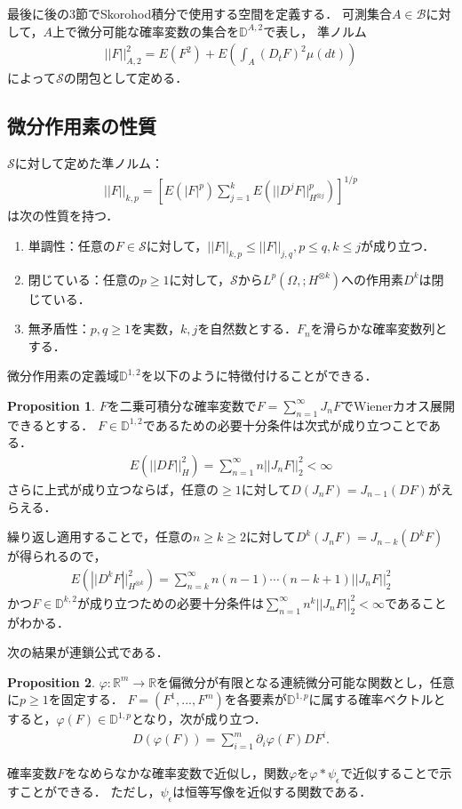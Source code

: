 \documentclass[a4paper,10pt]{jsarticle}
\theoremstyle{definition}
\newtheorem{proposition}{Proposition}
\newcommand{\eq}[1]{\begin{align}#1\end{align}}
\newcommand{\enums}[1]{\begin{enumerate}#1\end{enumerate}}
\begin{document}
最後に後の3節でSkorohod積分で使用する空間を定義する．
可測集合$A\in\mathcal{B}$に対して，$A$上で微分可能な確率変数の集合を$\mathbb{D}^{A,2}$で表し，
準ノルム
\eq{||F||^2_{A,2}=E(F^2)+E\left(\int_A\left(D_tF\right)^2\mu(dt)\right)}
によって$\mathcal{S}$の閉包として定める．

\subsection{微分作用素の性質}
$\mathcal{S}$に対して定めた準ノルム：
\eq{||F||_{k,p}=\left[E(|F|^p)\sum_{j=1}^kE\left(||D^jF||^p_{H^{\otimes j}}\right)\right]^{1/p}}
は次の性質を持つ．
\enums{
	\item 単調性：任意の$F\in\mathcal{S}$に対して，$||F||_{k,p}\le||F||_{j,q},p\le q,k\le j$が成り立つ．
	\item 閉じている：任意の$p\ge1$に対して，$\mathcal{S}$から$L^p\left(\Omega,;H^{\otimes k}\right)$への作用素$D^k$は閉じている．
	\item 無矛盾性：$p,q\ge1$を実数，$k,j$を自然数とする．$F_n$を滑らかな確率変数列とする．
}

微分作用素の定義域$\mathbb{D}^{1,2}$を以下のように特徴付けることができる．
\begin{proposition}\label{prop1.2.2}
$F$を二乗可積分な確率変数で$F=\sum^\infty_{n=1}J_nF$でWienerカオス展開できるとする．
$F\in\mathbb{D}^{1,2}$であるための必要十分条件は次式が成り立つことである．
\eq{E\left(||DF||^2_H\right)=\sum^\infty_{n=1}n||J_nF||^2_2<\infty}
さらに上式が成り立つならば，任意の$\ge1$に対して$D(J_nF)=J_{n-1}(DF)$がえらえる．
\end{proposition}
繰り返し適用することで，任意の$n\ge k\ge2$に対して$D^k(J_nF)=J_{n-k}(D^kF)$が得られるので，
\eq{E\left(\left||D^kF\right||^2_{H^{\otimes k}}\right)=\sum^\infty_{n=k}n(n-1)\cdots(n-k+1)||J_nF||^2_2}
かつ$F\in\mathbb{D}^{k,2}$が成り立つための必要十分条件は$\sum^\infty_{n=1}n^k||J_nF||^2_2<\infty$であることがわかる．

次の結果が連鎖公式である．
\begin{proposition}\label{prop1.2.3}
$\varphi:\mathbb{R}^m\rightarrow\mathbb{R}$を偏微分が有限となる連続微分可能な関数とし，任意に$p\ge1$を固定する．
$F=\left(F^1,...,F^m\right)$を各要素が$\mathbb{D}^{1,p}$に属する確率ベクトルとすると，$\varphi(F)\in\mathbb{D}^{1,p}$となり，次が成り立つ．
\eq{D\left(\varphi(F)\right)=\sum^m_{i=1}\partial_i\varphi(F)DF^i.}
\end{proposition}
確率変数$F$をなめらなかな確率変数で近似し，関数$\varphi$を$\varphi*\psi_\epsilon$で近似することで示すことができる．
ただし，$\psi_\epsilon$は恒等写像を近似する関数である．
\end{document}

